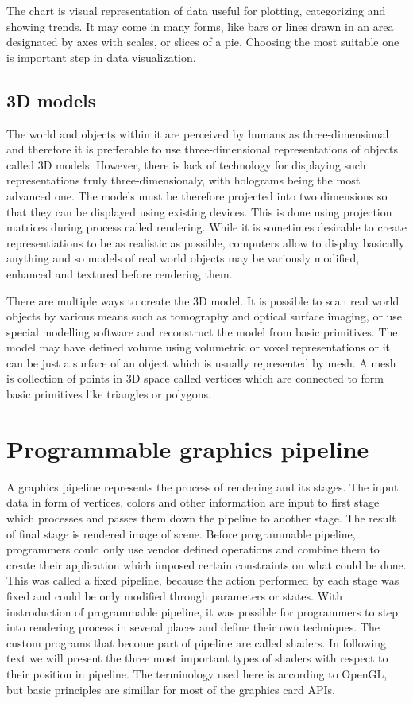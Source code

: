 The chart is visual representation of data useful for plotting, categorizing and
showing trends. It may come in many forms, like bars or lines drawn in an
area designated by axes with scales, or slices of a pie. Choosing the most
suitable one is important step in data visualization.

\subsection{3D models}
The world and objects within it are perceived by humans as three-dimensional and
therefore it is prefferable to use three-dimensional representations of objects
called 3D models. However, there is lack of technology for displaying such
representations truly three-dimensionaly, with holograms being the most advanced
one. The models must be therefore projected into two dimensions so that they can
be displayed using existing devices. This is done using projection matrices
during process called rendering. While it is sometimes desirable to create
representiations to be as realistic as possible, computers allow to display
basically anything and so models of real world objects may be variously
modified, enhanced and textured before rendering them. 

There are multiple ways to create the 3D model. It is possible to scan real
world objects by various means such as tomography and optical surface imaging,
or use special modelling software and reconstruct the model from basic
primitives. The model may have defined volume using volumetric or voxel
representations or it can be just a surface of an object which is usually
represented by mesh. A mesh is collection of points in 3D space called vertices
which are connected to form basic primitives like triangles or polygons.

\section{Programmable graphics pipeline}
A graphics pipeline represents the process of rendering and its stages. The
input data in form of vertices, colors and other information are input to first stage
which processes and passes them down the pipeline to another stage.
The result of final stage is rendered image of scene. Before programmable
pipeline, programmers could only use vendor defined operations and combine them
to create their application which imposed certain constraints on what could be
done. This was called a fixed pipeline, because the action performed by each
stage was fixed and could be only modified through parameters or states. With
instroduction of programmable pipeline, it was possible for programmers to step
into rendering process in several places and define their own techniques. The
custom programs that become part of pipeline are called shaders. In following
text we will present the three most important types of shaders with respect to
their position in pipeline. The terminology used here is according to OpenGL,
but basic principles are simillar for most of the graphics card APIs.

